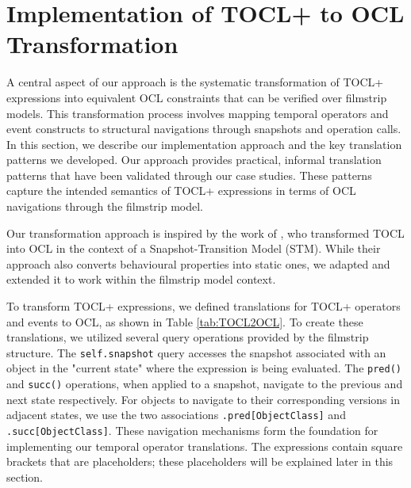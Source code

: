 \section{Implementation of TOCL+ to OCL Transformation}
\label{sec:translation}

\hspace{1cm} A central aspect of our approach is the systematic transformation of TOCL+ 
expressions into equivalent OCL constraints that can be verified over filmstrip 
models. This transformation process involves mapping temporal operators 
and event constructs to structural navigations through snapshots and operation calls. 
In this section, we describe our implementation approach and the key translation 
patterns we developed. Our approach provides practical, informal translation patterns 
that have been validated through our case studies. These patterns capture the intended 
semantics of TOCL+ expressions in terms of OCL navigations through the filmstrip model.

Our transformation approach is inspired by the work of \cite{TOCL2OCL}, who 
transformed TOCL \cite{TOCL} into OCL in the context of a Snapshot-Transition Model 
(STM). While their approach also converts behavioural properties into static ones, we 
adapted and extended it to work within the filmstrip model context.

To transform TOCL+ expressions, we defined translations for TOCL+ operators and 
events to OCL, as shown in Table \ref{tab:TOCL2OCL}. To create these translations, 
we utilized several query operations provided by the filmstrip structure. 
The \texttt{self.snapshot} query accesses the snapshot associated with an object in the 
"current state" where the expression is being evaluated. The \texttt{pred()} and \texttt{succ()} 
operations, when applied to a snapshot, navigate to the previous and next state 
respectively. For objects to navigate to their corresponding versions in adjacent 
states, we use the two associations \texttt{.pred[ObjectClass]} and \texttt{.succ[ObjectClass]}. These navigation mechanisms 
form the foundation for implementing our temporal operator translations.
The expressions contain square brackets that are placeholders; these placeholders
will be explained later in this section.

